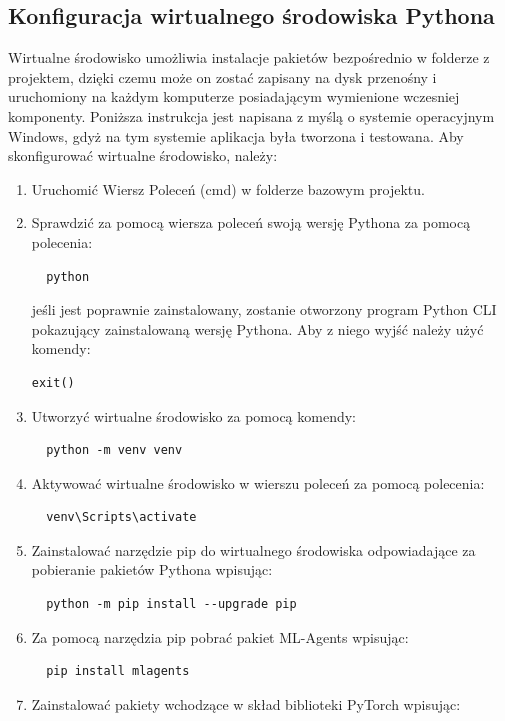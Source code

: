 \documentclass{SGGW-thesis}
\begin{document}
\subsection{Konfiguracja wirtualnego środowiska Pythona}
Wirtualne środowisko umożliwia instalacje pakietów bezpośrednio w folderze z projektem, dzięki czemu może on zostać zapisany na dysk przenośny i uruchomiony na każdym komputerze posiadającym wymienione wczesniej komponenty.
Poniższa instrukcja jest napisana z myślą o systemie operacyjnym Windows, gdyż na tym systemie aplikacja była tworzona i testowana.
Aby skonfigurować wirtualne środowisko, należy:
\begin{enumerate}
  \item{Uruchomić Wiersz Poleceń (cmd) w folderze bazowym projektu}.
  \item{Sprawdzić za pomocą wiersza poleceń swoją wersję Pythona za pomocą polecenia:
  \begin{lstlisting}
  python
  \end{lstlisting}
  jeśli jest poprawnie zainstalowany, zostanie otworzony program Python CLI pokazujący zainstalowaną wersję Pythona. Aby z niego wyjść należy użyć komendy:
  \begin{lstlisting}[language=Python]
  exit()
  \end{lstlisting}
  }
  \item{Utworzyć wirtualne środowisko za pomocą komendy:
  \begin{lstlisting}
  python -m venv venv
  \end{lstlisting}
  }
  \item{Aktywować wirtualne środowisko w wierszu poleceń za pomocą polecenia:
  \begin{lstlisting}
  venv\Scripts\activate
  \end{lstlisting}
  }
  \item{Zainstalować narzędzie pip do wirtualnego środowiska odpowiadające za pobieranie pakietów Pythona wpisując:
  \begin{lstlisting}
  python -m pip install --upgrade pip
  \end{lstlisting}
  }
  \item{Za pomocą narzędzia pip pobrać pakiet ML-Agents wpisując:
  \begin{lstlisting}
  pip install mlagents
  \end{lstlisting}
  }
  \item{Zainstalować pakiety wchodzące w skład biblioteki PyTorch wpisując:
  \begin{lstlisting}

\end{lstlisting}}
\end{enumerate}
\end{document}
